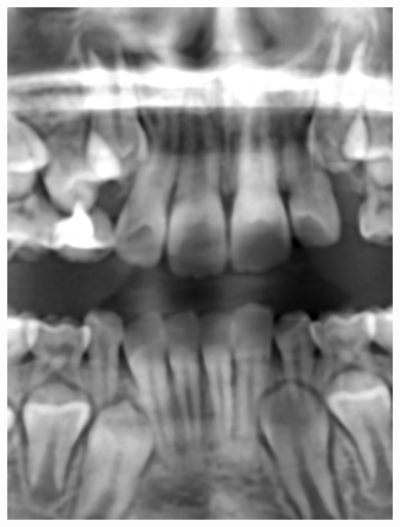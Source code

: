 \documentclass[a4paper,titlepage,12pt]{article}
\begin{document}
\begin{figure}
\begin{minipage}[b]{0.32\linewidth}
		\includegraphics[width=\linewidth]{preprocess/hats.png}
	\end{minipage}
	\begin{minipage}[b]{0.32\linewidth}

\end{minipage}
\end{figure}
\end{document}
